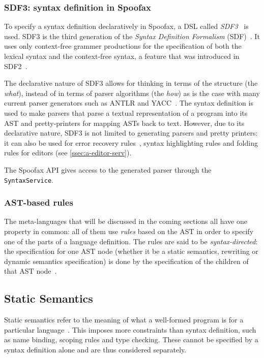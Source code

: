 \subsubsection{SDF3: syntax definition in Spoofax}
\label{ssec:a-orgheadline1}
To specify a syntax definition declaratively in Spoofax, a DSL called
\emph{SDF3}~\cite{Vollebregt12} is used.  SDF3 is the third generation
of the \emph{Syntax Definition Formalism} (SDF)~\cite{Heering89}. It
uses only context-free grammer productions for the specification of
both the lexical syntax and the context-free syntax, a feature that
was introduced in SDF2~\cite{Visser97}.

The declarative nature of SDF3 allows for thinking in terms of the
structure (the \emph{what}), instead of in terms of parser algorithms (the
\emph{how}) as is the case with many current parser generators such as
ANTLR and YACC~\cite{Kats10b}. The syntax definition is used to
make parsers that parse a textual representation of a program into its
AST and pretty-printers for mapping ASTs back to text. However, due to
its declarative nature, SDF3 is not limited to generating parsers and
pretty printers: it can also be used for error recovery
rules~\cite{deJonge12}, syntax highlighting rules and folding
rules for editors (see \cref{ssec:a-editor-serv}).

The Spoofax API gives access to the generated parser through the
\texttt{SyntaxService}.

\subsubsection{AST-based rules}
\label{ssec:a-orgheadline2}
The meta-languages that will be discussed in the coming sections all
have one property in common: all of them use \emph{rules} based on the AST
in order to specify one of the parts of a language definition. The
rules are said to be \emph{syntax-directed}: the specification for one AST
node (whether it be a static semantics, rewriting or dynamic semantics
specification) is done by the specification of the children of that
AST node~\cite{Winskel93}.

\subsection{Static Semantics}
\label{ssec:a-static-analysis}
Static semantics refer to the meaning of what a well-formed program is
for a particular language~\cite{Milner97}. This imposes more
constraints than syntax definition, such as name binding, scoping
rules and type checking. These cannot be specified by a syntax
definition alone and are thus considered separately.


